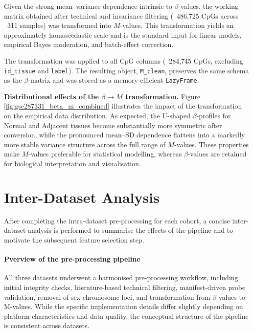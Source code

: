 \documentclass[10pt]{extarticle}
\newcommand{\good}[1]{\textcolor{teal!70!black}{\ding{51}~#1}}
\begin{document}
Given the strong mean--variance dependence intrinsic to $\beta$-values, the working
matrix obtained after technical and invariance filtering  
(\good{486{,}725 CpGs} across \good{311 samples}) 
was transformed into $M$-values.
This transformation yields an approximately homoscedastic scale and is the standard
input for linear models, empirical Bayes moderation, and batch-effect correction.

The transformation was applied to all CpG columns (\good{284{,}745 CpGs}, excluding
\texttt{id\_tissue} and \texttt{label}).  
The resulting object, \texttt{M\_clean}, preserves the same schema as the
$\beta$-matrix and was stored as a memory-efficient \texttt{LazyFrame}.

\textbf{Distributional effects of the $\beta \rightarrow M$ transformation.}
Figure  \ref{fig:gse287331_beta_m_combined} illustrates the
impact of the transformation on the empirical data distribution.  
As expected, the U-shaped $\beta$-profiles for Normal and Adjacent tissues become
substantially more symmetric after conversion, while the pronounced mean--SD
dependence flattens into a markedly more stable variance structure across the full
range of $M$-values.  
These properties make $M$-values preferable for statistical modelling, whereas
$\beta$-values are retained for biological interpretation and visualisation.


\section{Inter-Dataset Analysis}
\label{sec:inter_dataset}

After completing the intra-dataset pre-processing for each cohort, a concise inter-dataset analysis is performed to summarise the effects of the pipeline and to motivate the subsequent feature selection step. 
\paragraph{Pverview of the pre-processing pipeline}
All three datasets underwent a harmonised pre-processing workflow, including initial integrity checks, literature-based technical filtering, manifest-driven probe validation, removal of sex-chromosome loci, and transformation from $\beta$-values to M-values. While the specific implementation details differ slightly depending on platform characteristics and data quality, the conceptual structure of the pipeline is consistent across datasets.
\end{document}
